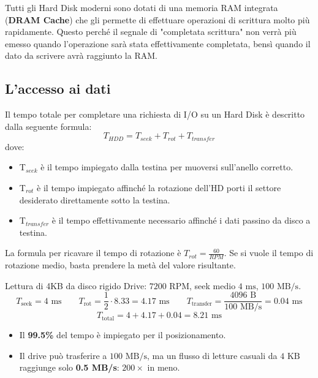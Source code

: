 \documentclass[12pt]{report}
\begin{document}
	Tutti gli Hard Disk moderni sono dotati di una memoria RAM integrata (\textbf{DRAM Cache}) che gli permette di effettuare operazioni di scrittura molto più rapidamente. Questo perché il segnale di "completata scrittura" non verrà più emesso quando l'operazione sarà stata effettivamente completata, bensì quando il dato da scrivere avrà raggiunto la RAM.
	
	\subsection{L'accesso ai dati}
	Il tempo totale per completare una richiesta di I/O su un Hard Disk è descritto dalla seguente formula:
	\[
		T_{HDD} = T_{seek} + T_{rot} + T_{transfer}
	\]
	dove:
	\begin{itemize}
		\item T$_{seek}$ è il tempo impiegato dalla testina per muoversi sull'anello corretto.
		
		\item T$_{rot}$ è il tempo impiegato affinché la rotazione dell'HD porti il settore desiderato direttamente sotto la testina.
		
		\item T$_{transfer}$ è il tempo effettivamente necessario affinché i dati passino da disco a testina.
	\end{itemize}
	
	La formula per ricavare il tempo di rotazione è $T_{rot} = \frac{60}{RPM}$. Se si vuole il tempo di rotazione medio, basta prendere la metà del valore risultante.\\
	\begin{esempio}{Lettura di 4KB da disco rigido}{}
		Drive: $7200\text{ RPM}$, seek medio $4\text{ ms}$, $100\text{ MB/s}$.
		\[
		T_{\text{seek}} = 4\text{ ms} \qquad T_{\text{rot}} = \frac{1}{2} \cdot 8.33 = 4.17\text{ ms} \qquad T_{\text{transfer}} = \frac{4096\text{ B}}{100\text{ MB/s}} = 0.04\text{ ms}
		\]
		\[
		T_{\text{total}} = 4 + 4.17 + 0.04 = 8.21\text{ ms}
		\]
		\begin{itemize}
			\item Il \textbf{99.5\%} del tempo è impiegato per il posizionamento.
			\item Il drive può trasferire a $100\text{ MB/s}$, ma un flusso di letture casuali da $4\text{ KB}$ raggiunge solo \textbf{0.5 MB/s}: $200\times$ in meno.
		\end{itemize}
	\end{esempio}
	
\end{document}
